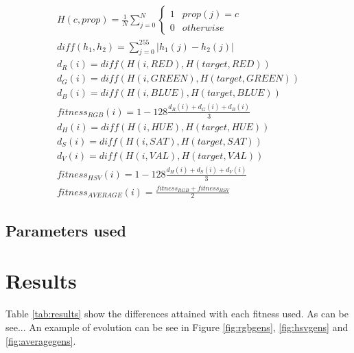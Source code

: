 \documentclass[conference]{IEEEtran}
\begin{document}
\begin{eqnarray}
	\label{eq:fitness}
	H(c, prop) = \frac{1}{N}\sum_{j=0}^N \left\{\begin{matrix}
1 & prop(j) = c\\ 
0 & otherwise
\end{matrix}\right. \\
	diff(h_1, h_2) = \sum_{j=0}^{255} |h_1(j) - h_2(j)| \\
	d_R(i) = diff(H(i, RED), H(target, RED))\\
	d_G(i) = diff(H(i, GREEN), H(target, GREEN))\\
	d_B(i) =  diff(H(i, BLUE), H(target, BLUE))\\
	fitness_{RGB}(i) = 1 - 128\frac{d_R(i) + d_G(i) + d_B(i)}{3} \\
	d_H(i) = diff(H(i, HUE), H(target, HUE))\\
	d_S(i) = diff(H(i, SAT), H(target, SAT))\\
	d_V(i) =  diff(H(i, VAL), H(target, VAL))\\
	fitness_{HSV}(i) = 1 - 128\frac{d_H(i) + d_S(i) + d_V(i)}{3}\\	
	fitness_{AVERAGE}(i) = \frac{fitness_{RGB}+fitness_{HSV}}{2}
\end{eqnarray}

\subsection{Parameters used}


\section{Results} 
\label{sec:results}

Table \ref{tab:results} show the differences attained with each fitness used. As can be see... An example of evolution can be see in Figure \ref{fig:rgbgens}, \ref{fig:hsvgens} and \ref{fig:averagegens}. 
\end{document}
